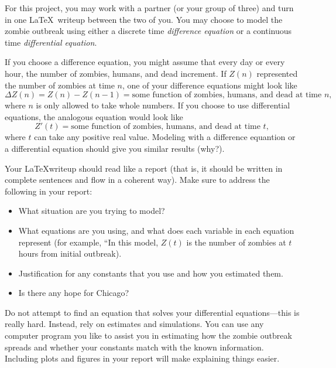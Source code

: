 \documentclass[letter]{article}
\begin{document}
	For this project, you may work with a partner (or your group of three) and turn in one \LaTeX\ 
	writeup between the two of you.  You may choose to model the zombie outbreak using either
	a discrete time \emph{difference equation} or a continuous time \emph{differential equation}.

	If you choose a difference equation, you might assume that every day or every hour, the
	number of zombies, humans, and dead increment.  If $Z(n)$ represented the number of zombies
	at time $n$, one of your difference equations might look like
	\[
		\Delta Z(n) = Z(n) - Z(n-1) = \text{some function of zombies, humans, and dead at time $n$},
	\]
	where $n$ is only allowed to take whole numbers.
	If you choose to use differential equations, the analogous equation would look like
	\[
		Z'(t) = \text{some function of zombies, humans, and dead at time $t$},
	\]
	where $t$ can take any positive real value.  Modeling with a difference equantion or
	a differential equation should give you similar results (why?).

	Your \LaTeX writeup should read like a report (that is, it should be written in complete sentences
	and flow in a coherent way).  Make sure to address the following in your report:
	\begin{itemize}
		\item What situation are you trying to model?
		\item What equations are you using, and what does each variable in each equation represent
			(for example, ``In this model, $Z(t)$ is the number of zombies at $t$ hours from
			initial outbreak).
		\item Justification for any constants that you use and how you estimated them.
		\item Is there any hope for Chicago?
	\end{itemize}

	Do not attempt to find an equation that solves your differential equations---this is really hard.
	Instead, rely on estimates and simulations.  You can use any computer program you like to assist
	you in estimating how the zombie outbreak spreads and whether your constants match with the
	known information.  Including plots and figures in your report will make explaining things easier.
\end{document}
